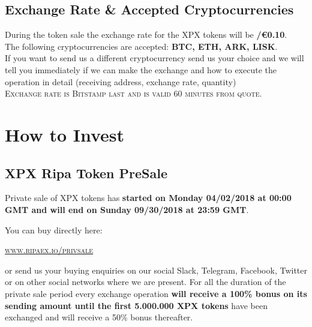 \documentclass[11pt,fleqn,oneside]{book} %
\begin{document}
\subsection{Exchange Rate \& Accepted Cryptocurrencies}
During the token sale the exchange rate for the XPX tokens will be \textbf{\PHP/\euro0.10}.\\

The following cryptocurrencies are accepted: \textbf{BTC, ETH, ARK, LISK}.\\

If you want to send us a different cryptocurrency send us your choice and we will tell you immediately if we can make 
the exchange and how to execute the operation in detail (receiving address, exchange rate, quantity)\\

\textsc{Exchange rate is Bitstamp last and is valid 60 minutes from quote}.

\section{How to Invest}
\subsection{XPX Ripa Token PreSale}
Private sale of XPX tokens has \textbf{started on Monday 04/02/2018 at 00:00 GMT and will end on Sunday 09/30/2018 at 23:59 GMT}.

You can buy directly here: 
\begin{center}
	\href{https://www.ripaex.io/privsale}{\textsc{www.ripaex.io/privsale}}
\end{center}

or send us your buying enquiries on our social Slack, Telegram, Facebook, Twitter or on other social networks where we are present.
For all the duration of the private sale period every exchange operation \textbf{will receive a 100\% bonus on its sending amount
until the first 5.000.000 XPX tokens} have been exchanged and will receive a 50\% bonus thereafter.
\end{document}
